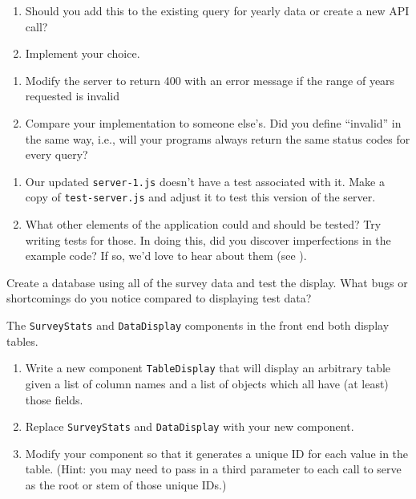 \begin{enumerate}
\item
  Should you add this to the existing query for yearly data or create a new API call?
\item
  Implement your choice.
\end{enumerate}


\begin{enumerate}
\item
  Modify the server to return 400 with an error message
  if the range of years requested is invalid
\item
  Compare your implementation to someone else's.
  Did you define ``invalid'' in the same way,
  i.e.,
  will your programs always return the same status codes for every query?
\end{enumerate}


\begin{enumerate}
\item
  Our updated \texttt{server-1.js} doesn't have a test associated with it.
  Make a copy of \texttt{test-server.js} and adjust it to test this version of the
  server.
\item
  What other elements of the application could and should be tested?
  Try writing tests for those.
  In doing this, did you discover imperfections in the example code?
  If so, we'd love to hear about them (see ).
\end{enumerate}


Create a database using all of the survey data and test the display.
What bugs or shortcomings do you notice compared to displaying test data?


The \texttt{SurveyStats} and \texttt{DataDisplay} components in the front end both display tables.

\begin{enumerate}
\item
  Write a new component \texttt{TableDisplay} that will display an arbitrary table
  given a list of column names
  and a list of objects which all have (at least) those fields.
\item
  Replace \texttt{SurveyStats} and \texttt{DataDisplay} with your new component.
\item
  Modify your component so that it generates a unique ID for each value in the table.
  (Hint: you may need to pass in a third parameter to each call
  to serve as the root or stem of those unique IDs.)
\end{enumerate}

